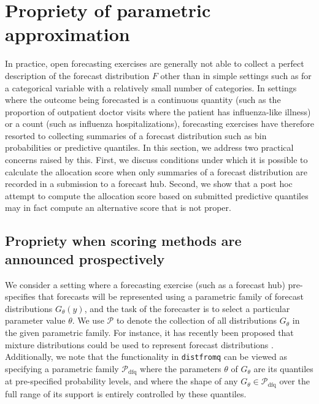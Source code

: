 \documentclass{article}\usepackage[]{graphicx}\usepackage[]{xcolor}
\begin{document}
\section{Propriety of parametric approximation} %
\label{sec:propriety_of_parametric_approximation}

In practice, open forecasting exercises are generally not able to collect a perfect description of the forecast
distribution $F$ other than in simple settings such as for a categorical variable with a relatively small number of
categories. In settings where the outcome being forecasted is a continuous quantity (such as the proportion of
outpatient doctor visits where the patient has influenza-like illness) or a count (such as influenza hospitalizations),
forecasting exercises have therefore resorted to collecting summaries of a forecast distribution such as bin
probabilities or predictive quantiles. In this section, we address two practical concerns raised by this. First, we
discuss conditions under which it is possible to calculate the allocation score when only summaries of a forecast
distribution are recorded in a submission to a forecast hub. Second, we show that a post hoc attempt to compute the
allocation score based on submitted predictive quantiles may in fact compute an alternative score that is not proper.

\subsection{Propriety when scoring methods are announced prospectively}

We consider a setting where a forecasting exercise (such as a forecast hub) pre-specifies that forecasts will be
represented using a parametric family of forecast distributions $G_\theta(y)$, and the task of the forecaster is to
select a particular parameter value $\theta$. We use $\mathcal{P}$ to denote the collection of all distributions
$G_\theta$ in the given parametric family. For instance, it has recently been proposed that mixture distributions could
be used to represent forecast distributions \citep{wadsworth2023mixture}. Additionally, we note that the functionality
in \verb`distfromq` can be viewed as specifying a parametric family $\mathcal{P}_{\mathrm{dfq}}$ where the parameters
$\theta$ of $G_\theta$ are its quantiles at pre-specified probability levels, and where the shape of any $G_\theta \in
\mathcal{P}_{\mathrm{dfq}}$ over the full range of its support is entirely controlled by these quantiles.
\end{document}

